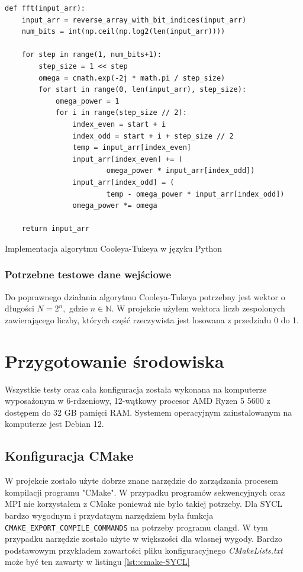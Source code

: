 \documentclass[a4paper,12pt]{book} %
\begin{document}
\begin{lstfloat}[H]
\lstset{language=Python}
\begin{lstlisting}[frame=single]
def fft(input_arr):
    input_arr = reverse_array_with_bit_indices(input_arr)
    num_bits = int(np.ceil(np.log2(len(input_arr))))

    for step in range(1, num_bits+1):
        step_size = 1 << step
        omega = cmath.exp(-2j * math.pi / step_size)
        for start in range(0, len(input_arr), step_size):
            omega_power = 1
            for i in range(step_size // 2):
                index_even = start + i
                index_odd = start + i + step_size // 2
                temp = input_arr[index_even]
                input_arr[index_even] += (
                        omega_power * input_arr[index_odd])
                input_arr[index_odd] = (
                        temp - omega_power * input_arr[index_odd])
                omega_power *= omega

    return input_arr
\end{lstlisting}
\caption{Implementacja algorytmu Cooleya-Tukeya w języku Python}
\label{lst:fft_python}
\end{lstfloat}
\subsubsection{Potrzebne testowe dane wejściowe}
Do poprawnego działania algorytmu Cooleya-Tukeya potrzebny jest wektor o długości $N = 2^n,$ gdzie $n \in \mathbb{N}$. W projekcie użyłem wektora liczb zespolonych zawierającego liczby, których część rzeczywista jest losowana z przedziału 0 do 1.
\section{Przygotowanie środowiska}
Wszystkie testy oraz cała konfiguracja została wykonana na komputerze wyposażonym w 6-rdzeniowy, 12-wątkowy procesor AMD Ryzen 5 5600 z dostępem do 32 GB pamięci RAM.
Systemem operacyjnym zainstalowanym na komputerze jest Debian 12.
\subsection{Konfiguracja CMake}
W projekcie zostało użyte dobrze znane narzędzie do zarządzania procesem kompilacji programu "CMake". W przypadku programów sekwencyjnych oraz MPI nie korzystałem z CMake ponieważ nie było takiej potrzeby.
Dla SYCL bardzo wygodnym i przydatnym narzędziem była funkcja \texttt{CMAKE\_EXPORT\_COMPILE\_COMMANDS} na potrzeby programu clangd. W tym przypadku narzędzie zostało użyte w większości dla własnej wygody. Bardzo podstawowym przykładem zawartości pliku konfiguracyjnego \emph{CMakeLists.txt} może być ten zawarty w listingu \ref{lst::cmake-SYCL}
\end{document}
